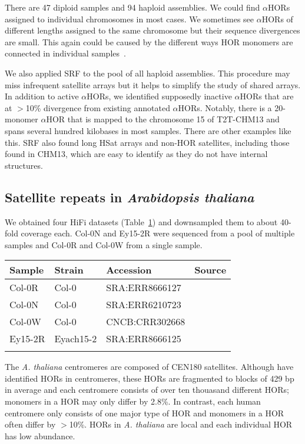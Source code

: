 \documentclass{bioinfo}
\newcommand{\revised}[1]{{\color{blue}#1}}
\begin{document}
There are 47 diploid samples and 94 haploid assemblies. We could find
$\alpha$HORs assigned to individual chromosomes in most cases. We sometimes see
$\alpha$HORs of different lengths assigned to the same chromosome but their
sequence divergences are small. This again could be caused by the different
ways HOR monomers are connected in individual
samples~\citep{Logsdon:2021aa,Kunyavskaya:2022tx}.

We also applied SRF to the pool of all haploid assemblies. This procedure
may miss infrequent satellite arrays but it helps to simplify the study of
shared arrays. In addition to active $\alpha$HORs, we identified supposedly
inactive $\alpha$HORs that are at $>$10\% divergence from existing annotated
$\alpha$HORs. Notably, there is a 20-monomer $\alpha$HOR that is mapped to
the chromosome 15 of T2T-CHM13 and spans several hundred kilobases in most
samples. There are other examples like this. SRF also found long HSat
arrays and non-HOR satellites, including those found in CHM13, which are easy
to identify as they do not have internal structures.

\subsection{Satellite repeats in \emph{Arabidopsis thaliana}}

We obtained four HiFi datasets (Table~\ref{tab:at}) and downsampled them to about
40-fold coverage each. Col-0N and Ey15-2R were sequenced from a pool of
multiple samples and Col-0R and Col-0W from a single sample.

\begin{table}[!hb]
{\label{tab:at}
\begin{tabular}{p{1.3cm}p{1.5cm}ll}
\toprule
Sample & Strain & Accession & Source \\
\midrule
Col-0R & Col-0 & SRA:ERR8666127 & \citet{Rabanal:2022aa} \\
Col-0N & Col-0 & SRA:ERR6210723 & \citet{Naish:2021aa} \\
Col-0W & Col-0 & CNCB:CRR302668 & \citet{Wang:2022ab} \\
Ey15-2R & Eyach15-2 & SRA:ERR8666125 & \citet{Rabanal:2022aa} \\
\botrule
\end{tabular}}{}
\end{table}

The \emph{A. thaliana} centromeres are composed of CEN180 satellites.
\revised{Although \citet{Naish:2021aa} have identified HORs in centromeres,
these HORs are fragmented to blocks of 429 bp in average and each centromere
consists of over ten thouasand different HORs; monomers in a HOR may only
differ by 2.8\%. In contrast, each human centromere only consists of one major
type of HOR and monomers in a HOR often differ by $>$10\%. HORs in \emph{A.
thaliana} are local and each individual HOR has low abundance.}
\end{document}
